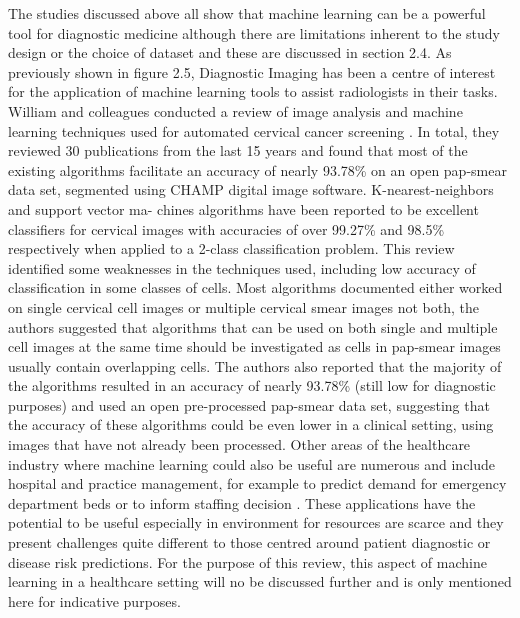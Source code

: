  The studies discussed above all show that machine learning can be a powerful tool for diagnostic medicine although there are limitations inherent to the study design or the choice of dataset and these are discussed in section 2.4.\newline
 As previously shown in figure 2.5, Diagnostic Imaging has been a centre of interest for the application of machine learning tools to assist radiologists in their tasks. William and colleagues conducted a review of image analysis and machine learning techniques used for automated cervical cancer screening \citep{William:2018ia}. In total, they reviewed 30 publications from the last 15 years and found that most of the existing algorithms facilitate an accuracy of nearly 93.78\% on an open pap-smear data set, segmented using CHAMP digital image software. K-nearest-neighbors and support vector ma- chines algorithms have been reported to be excellent classifiers for cervical images with accuracies of over 99.27\% and 98.5\% respectively when applied to a 2-class classification problem.\newline 
 This review identified some weaknesses in the techniques used, including low accuracy of classification in some classes of cells. Most algorithms documented either worked on single cervical cell images or multiple cervical smear images not both, the authors suggested that algorithms that can be used on both single and multiple cell images at the same time should be investigated as cells in pap-smear images usually contain overlapping cells.\newline
 The authors also reported that the majority of the algorithms resulted in an accuracy of nearly 93.78\% (still low for diagnostic purposes) and used an open pre-processed pap-smear data set, suggesting that the accuracy of these algorithms could be even lower in a clinical setting, using images that have not already been processed.\newline 
Other areas of the healthcare industry where machine learning could also be useful are numerous and include hospital and practice management, for example to predict demand for emergency department beds or to inform staffing decision \citep{Callahan:2017bz, Tiwari:2014bq}. These applications have the potential to be useful especially in environment for resources are scarce and they present challenges quite different to those centred around patient diagnostic or disease risk predictions. For the purpose of this review, this aspect of machine learning in a healthcare setting will no be discussed further and is only mentioned here for indicative purposes.\newline


